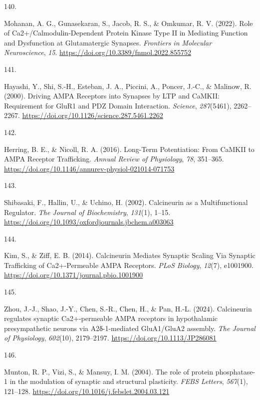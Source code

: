 \documentclass[
  11pt,
  letterpaper,
]{scrreprt}
\newlength{\cslhangindent}
\newlength{\csllabelwidth}
\newenvironment{CSLReferences}[2] %
 {\begin{list}{}{%
  \setlength{\itemindent}{0pt}
  \setlength{\leftmargin}{0pt}
  \setlength{\parsep}{0pt}
  \ifodd #1
   \setlength{\leftmargin}{\cslhangindent}
   \setlength{\itemindent}{-1\cslhangindent}
  \fi
  \setlength{\itemsep}{#2\baselineskip}}}
 {\end{list}}
\newcommand{\CSLLeftMargin}[1]{\parbox[t]{\csllabelwidth}{\strut#1\strut}}
\newcommand{\CSLRightInline}[1]{\parbox[t]{\linewidth - \csllabelwidth}{\strut#1\strut}}
\begin{document}
\begin{CSLReferences}{0}{0}
\CSLLeftMargin{140. }%
\CSLRightInline{Mohanan, A. G., Gunasekaran, S., Jacob, R. S., \&
Omkumar, R. V. (2022). Role of {Ca2}+/{Calmodulin-Dependent Protein
Kinase Type II} in {Mediating Function} and {Dysfunction} at
{Glutamatergic Synapses}. \emph{Frontiers in Molecular Neuroscience},
\emph{15}. \url{https://doi.org/10.3389/fnmol.2022.855752}}

\CSLLeftMargin{141. }%
\CSLRightInline{Hayashi, Y., Shi, S.-H., Esteban, J. A., Piccini, A.,
Poncer, J.-C., \& Malinow, R. (2000). Driving {AMPA Receptors} into
{Synapses} by {LTP} and {CaMKII}: {Requirement} for {GluR1} and {PDZ
Domain Interaction}. \emph{Science}, \emph{287}(5461), 2262--2267.
\url{https://doi.org/10.1126/science.287.5461.2262}}

\CSLLeftMargin{142. }%
\CSLRightInline{Herring, B. E., \& Nicoll, R. A. (2016). Long-{Term
Potentiation}: {From CaMKII} to {AMPA Receptor Trafficking}.
\emph{Annual Review of Physiology}, \emph{78}, 351--365.
\url{https://doi.org/10.1146/annurev-physiol-021014-071753}}

\CSLLeftMargin{143. }%
\CSLRightInline{Shibasaki, F., Hallin, U., \& Uchino, H. (2002).
Calcineurin as a {Multifunctional Regulator}. \emph{The Journal of
Biochemistry}, \emph{131}(1), 1--15.
\url{https://doi.org/10.1093/oxfordjournals.jbchem.a003063}}

\CSLLeftMargin{144. }%
\CSLRightInline{Kim, S., \& Ziff, E. B. (2014). Calcineurin {Mediates
Synaptic Scaling Via Synaptic Trafficking} of {Ca2}+-{Permeable AMPA
Receptors}. \emph{PLoS Biology}, \emph{12}(7), e1001900.
\url{https://doi.org/10.1371/journal.pbio.1001900}}

\CSLLeftMargin{145. }%
\CSLRightInline{Zhou, J.-J., Shao, J.-Y., Chen, S.-R., Chen, H., \& Pan,
H.-L. (2024). Calcineurin regulates synaptic {Ca2}+-permeable {AMPA}
receptors in hypothalamic presympathetic neurons via Α2δ-1-mediated
{GluA1}/{GluA2} assembly. \emph{The Journal of Physiology},
\emph{602}(10), 2179--2197. \url{https://doi.org/10.1113/JP286081}}

\CSLLeftMargin{146. }%
\CSLRightInline{Munton, R. P., Vizi, S., \& Mansuy, I. M. (2004). The
role of protein phosphatase-1 in the modulation of synaptic and
structural plasticity. \emph{FEBS Letters}, \emph{567}(1), 121--128.
\url{https://doi.org/10.1016/j.febslet.2004.03.121}}


\end{CSLReferences}
\end{document}
